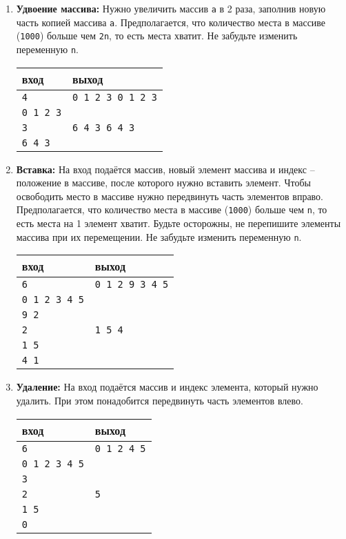 \documentclass[10pt]{article}
\begin{document}
\begin{enumerate}
\item \textbf{Удвоение массива:} Нужно увеличить массив \texttt{a} в 2 раза, заполнив новую часть копией массива \texttt{a}. Предполагается, что количество места в массиве (\texttt{1000}) больше чем \texttt{2n}, то есть места хватит. Не забудьте изменить переменную \texttt{n}.
\begin{center}
\begin{tabular}{ l | l }
 вход & выход \\ \hline
 \texttt{4} & \texttt{0 1 2 3 0 1 2 3}  \\  
 \texttt{0 1 2 3} &  \\ \hline
 \texttt{3} & \texttt{6 4 3 6 4 3}  \\
 \texttt{6 4 3} &  \\  
\end{tabular}
\end{center}

\item \textbf{Вставка:} На вход подаётся массив, новый элемент массива и индекс -- положение в массиве, после которого нужно вставить элемент. Чтобы освободить место в массиве нужно передвинуть часть элементов вправо. Предполагается, что количество места в массиве (\texttt{1000}) больше чем \texttt{n}, то есть места на 1 элемент хватит. Будьте осторожны, не перепишите элементы массива при их перемещении. Не забудьте изменить переменную \texttt{n}.
\begin{center}
\begin{tabular}{ l | l }
 вход & выход \\ \hline
 \texttt{6} & \texttt{0 1 2 9 3 4 5}  \\  
 \texttt{0 1 2 3 4 5} &  \\ 
 \texttt{9 2} &   \\ \hline
 \texttt{2} & \texttt{1 5 4}  \\  
 \texttt{1 5} &  \\ 
 \texttt{4 1} &   \\
\end{tabular}
\end{center}

\item \textbf{Удаление:} На вход подаётся массив и индекс элемента, который нужно удалить. При этом понадобится передвинуть часть элементов влево.
\begin{center}
\begin{tabular}{ l | l }
 вход & выход \\ \hline
 \texttt{6} & \texttt{0 1 2 4 5}  \\  
 \texttt{0 1 2 3 4 5} &  \\ 
 \texttt{3} &   \\ \hline
 \texttt{2} & \texttt{5}  \\  
 \texttt{1 5} &  \\ 
 \texttt{0} &   \\
\end{tabular}
\end{center}


\end{enumerate}
\end{document}
